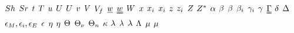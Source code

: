 \begin{mdframed}
$\sherwood$ \newline
$\strouhal$ \newline
$\timet$ \newline
$\Temp$ \newline
$\forcepot$ \newline
$\intenergy$ \newline
$\uvel$ \newline
$\vvel$ \newline
$\vol$ \newline
$\freevol$ \newline
$\vort$ \newline
$\vorttens$ \newline
$\work$ \newline
$\disp$ \newline
$\conjcoor$ \newline
$\specfrac$ \newline
$\heightz$ \newline                              
$\charges$ \newline
$\compress$ \newline
$\configint$ \newline
$\tdiff$ \newline
$\boltznorm$ \newline
$\texpcoeff$ \newline
$\sexcoeff$ \newline
$\actcoeff$ \newline
$\surftens$ \newline
$\straintens$ \newline
$\blthick$ \newline
$\iipf$ \newline
$\eddydiff$ \newline
$\dielec$ \newline
$\heateffic$ \newline
$\intrinsvisc$ \newline
$\dimltemp$ \newline
$\vibrfreqfac$ \newline
$\fftcoeff$ \newline
$\comeback$ \newline
$\wavel$ \newline
$\latheat$ \newline
$\debye$ \newline
$\debroglie$ \newline
$\chempot$ \newline
$\visc$ \newline

\end{mdframed}

